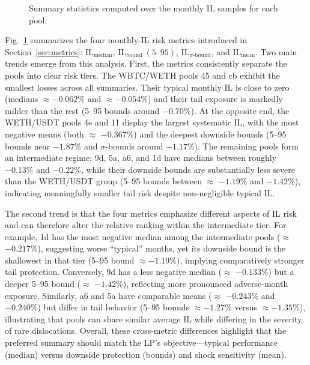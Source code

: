\documentclass[journal]{IEEEtran}
\begin{document}
\begin{figure}[t]
\centering
\resizebox{0.5\textwidth}{!}{%
        
    }
\caption{Summary statistics computed over the monthly IL samples for each pool.}
\label{fig:monthly_il_summary_metrics}
\end{figure}


Fig.~\ref{fig:monthly_il_summary_metrics} summarizes the four monthly-IL risk metrics introduced in Section~\ref{sec:metrics}: $\mathrm{IL}_{\text{median}}$, $\mathrm{IL}_{\text{bound}}~(5\text{--}95)$, $\mathrm{IL}_{\sigma\text{-bound}}$, and $\mathrm{IL}_{\text{mean}}$. Two main trends emerge from this analysis. 
First, the metrics consistently separate the pools into clear risk tiers. The WBTC/WETH pools 45 and cb exhibit the smallest losses across all summaries. Their typical monthly IL is close to zero (medians $\approx-0.062\%$ and $\approx-0.054\%$) and their tail exposure is markedly milder than the rest (5--95 bounds around $-0.70\%$). At the opposite end, the WETH/USDT pools 4e and 11 display the largest systematic IL, with the most negative means (both $\approx$ $-0.367\%$) and the deepest downside bounds (5--95 bounds near $-1.87\%$ and $\sigma$-bounds around $-1.17\%$). The remaining pools form an intermediate regime: 9d, 5a, a6, and 1d have medians between roughly $-0.13\%$ and $-0.22\%$, while their downside bounds are substantially less severe than the WETH/USDT group (5--95 bounds between $\approx$ $-1.19\%$ and $-1.42\%$), indicating meaningfully smaller tail risk despite non-negligible typical IL.

The second trend is that the four metrics emphasize different aspects of IL risk and can therefore alter the relative ranking within the intermediate tier. 
For example, 1d has the most negative median among the intermediate pools ($\approx$ $-0.217\%$), suggesting worse ``typical'' months, yet its downside bound is the shallowest in that tier (5--95 bound $\approx-1.19\%$), implying comparatively stronger tail protection. Conversely, 9d has a less negative median ($\approx$ $-0.133\%$) but a deeper 5--95 bound ($\approx$ $-1.42\%$), reflecting more pronounced adverse-month exposure. 
Similarly, a6 and 5a have comparable means ($\approx$ $-0.243\%$ and $-0.240\%$) but differ in tail behavior (5--95 bounds $\approx-1.27\%$ versus $\approx-1.35\%$), illustrating that pools can share similar average IL while differing in the severity of rare dislocations. 
Overall, these cross-metric differences highlight that the preferred summary should match the LP’s objective---typical performance (median) versus downside protection (bounds) and shock sensitivity (mean).
\end{document}
